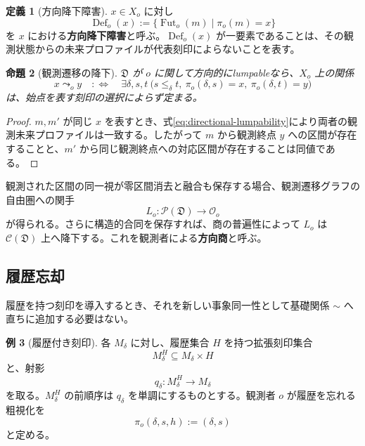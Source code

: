 \documentclass[a4paper,11pt]{ltjsarticle}
\theoremstyle{definition}
\newtheorem{definition}{定義}[section]
\newtheorem{example}[definition]{例}
\theoremstyle{plain}
\newtheorem{proposition}[definition]{命題}
\newcommand{\Fut}{\operatorname{Fut}}
\newcommand{\Def}{\operatorname{Def}}
\begin{document}
\begin{definition}[方向降下障害]
$x\in X_o$ に対し
\begin{equation}
 \Def_o(x)
 :=
 \{\Fut_o(m)\mid\pi_o(m)=x\}
 \label{eq:lumpability-defect}
\end{equation}
を $x$ における\textbf{方向降下障害}と呼ぶ。$\Def_o(x)$ が一要素であることは、その観測状態からの未来プロファイルが代表刻印によらないことを表す。
\end{definition}

\begin{proposition}[観測遷移の降下]
$\mathfrak D$ が $o$ に関して方向的にlumpableなら、$X_o$ 上の関係
\begin{equation}
 x\leadsto_o y
 \quad:\Longleftrightarrow\quad
 \exists\delta,s,t\ 
 \bigl(s\leq_\delta t,\
       \pi_o(\delta,s)=x,\
       \pi_o(\delta,t)=y\bigr)
 \label{eq:observed-transition}
\end{equation}
は、始点を表す刻印の選択によらず定まる。
\end{proposition}

\begin{proof}
$m,m'$ が同じ $x$ を表すとき、式\eqref{eq:directional-lumpability}により両者の観測未来プロファイルは一致する。したがって $m$ から観測終点 $y$ への区間が存在することと、$m'$ から同じ観測終点への対応区間が存在することは同値である。
\end{proof}

観測された区間の同一視が零区間消去と融合も保存する場合、観測遷移グラフの自由圏への関手
\[
 L_o:\mathcal P(\mathfrak D)\longrightarrow\mathcal O_o
\]
が得られる。さらに構造的合同を保存すれば、商の普遍性によって $L_o$ は $\mathcal C(\mathfrak D)$ 上へ降下する。これを観測者による\textbf{方向商}と呼ぶ。

\subsection{履歴忘却}

履歴を持つ刻印を導入するとき、それを新しい事象同一性として基礎関係 $\sim$ へ直ちに追加する必要はない。

\begin{example}[履歴付き刻印]
各 $M_\delta$ に対し、履歴集合 $H$ を持つ拡張刻印集合
\[
 M_\delta^H\subseteq M_\delta\times H
\]
と、射影
\[
 q_\delta:M_\delta^H\longrightarrow M_\delta
\]
を取る。$M_\delta^H$ の前順序は $q_\delta$ を単調にするものとする。観測者 $o$ が履歴を忘れる粗視化を
\[
 \pi_o(\delta,s,h):=(\delta,s)
\]
と定める。
\end{example}
\end{document}
